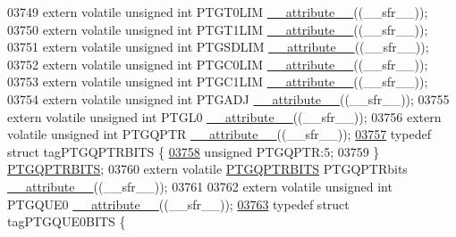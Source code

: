 \begin{DoxyCode}
03749 \textcolor{keyword}{extern} \textcolor{keyword}{volatile} \textcolor{keywordtype}{unsigned} \textcolor{keywordtype}{int}  PTGT0LIM \hyperlink{a00009_a493c46f03454991ccc5aa7a6e1dfb2a7}{\_\_attribute\_\_}((\_\_sfr\_\_));
03750 \textcolor{keyword}{extern} \textcolor{keyword}{volatile} \textcolor{keywordtype}{unsigned} \textcolor{keywordtype}{int}  PTGT1LIM \hyperlink{a00009_a493c46f03454991ccc5aa7a6e1dfb2a7}{\_\_attribute\_\_}((\_\_sfr\_\_));
03751 \textcolor{keyword}{extern} \textcolor{keyword}{volatile} \textcolor{keywordtype}{unsigned} \textcolor{keywordtype}{int}  PTGSDLIM \hyperlink{a00009_a493c46f03454991ccc5aa7a6e1dfb2a7}{\_\_attribute\_\_}((\_\_sfr\_\_));
03752 \textcolor{keyword}{extern} \textcolor{keyword}{volatile} \textcolor{keywordtype}{unsigned} \textcolor{keywordtype}{int}  PTGC0LIM \hyperlink{a00009_a493c46f03454991ccc5aa7a6e1dfb2a7}{\_\_attribute\_\_}((\_\_sfr\_\_));
03753 \textcolor{keyword}{extern} \textcolor{keyword}{volatile} \textcolor{keywordtype}{unsigned} \textcolor{keywordtype}{int}  PTGC1LIM \hyperlink{a00009_a493c46f03454991ccc5aa7a6e1dfb2a7}{\_\_attribute\_\_}((\_\_sfr\_\_));
03754 \textcolor{keyword}{extern} \textcolor{keyword}{volatile} \textcolor{keywordtype}{unsigned} \textcolor{keywordtype}{int}  PTGADJ \hyperlink{a00009_a493c46f03454991ccc5aa7a6e1dfb2a7}{\_\_attribute\_\_}((\_\_sfr\_\_));
03755 \textcolor{keyword}{extern} \textcolor{keyword}{volatile} \textcolor{keywordtype}{unsigned} \textcolor{keywordtype}{int}  PTGL0 \hyperlink{a00009_a493c46f03454991ccc5aa7a6e1dfb2a7}{\_\_attribute\_\_}((\_\_sfr\_\_));
03756 \textcolor{keyword}{extern} \textcolor{keyword}{volatile} \textcolor{keywordtype}{unsigned} \textcolor{keywordtype}{int}  PTGQPTR \hyperlink{a00009_a493c46f03454991ccc5aa7a6e1dfb2a7}{\_\_attribute\_\_}((\_\_sfr\_\_));
\hypertarget{a00009_source_l03757}{}\hyperlink{a00008}{03757} \textcolor{keyword}{typedef} \textcolor{keyword}{struct }tagPTGQPTRBITS \{
\hypertarget{a00009_source_l03758}{}\hyperlink{a00008_a27d47351bf197503c30730d25ebf22d9}{03758}   \textcolor{keywordtype}{unsigned} PTGQPTR:5;
03759 \} \hyperlink{a00008_d7/d5f/a00663}{PTGQPTRBITS};
03760 \textcolor{keyword}{extern} \textcolor{keyword}{volatile} \hyperlink{a00008_d7/d5f/a00663}{PTGQPTRBITS} PTGQPTRbits \hyperlink{a00009_a493c46f03454991ccc5aa7a6e1dfb2a7}{\_\_attribute\_\_}((\_\_sfr\_\_));
03761 
03762 \textcolor{keyword}{extern} \textcolor{keyword}{volatile} \textcolor{keywordtype}{unsigned} \textcolor{keywordtype}{int}  PTGQUE0 \hyperlink{a00009_a493c46f03454991ccc5aa7a6e1dfb2a7}{\_\_attribute\_\_}((\_\_sfr\_\_));
\hypertarget{a00009_source_l03763}{}\hyperlink{a00008}{03763} \textcolor{keyword}{typedef} \textcolor{keyword}{struct }tagPTGQUE0BITS \{

\end{DoxyCode}
